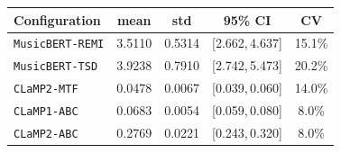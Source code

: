 \begin{tabular}{@{}lcccc@{}}
\toprule
Configuration & mean & std & 95\% CI & CV \\
\midrule
\texttt{MusicBERT-REMI} & 3.5110 & 0.5314 & [2.662,\,4.637] & 15.1\% \\
\texttt{MusicBERT-TSD} & 3.9238 & 0.7910 & [2.742,\,5.473] & 20.2\% \\
\texttt{CLaMP2-MTF} & 0.0478 & 0.0067 & [0.039,\,0.060] & 14.0\% \\
\texttt{CLaMP1-ABC} & 0.0683 & 0.0054 & [0.059,\,0.080] & 8.0\% \\
\texttt{CLaMP2-ABC} & 0.2769 & 0.0221 & [0.243,\,0.320] & 8.0\% \\
\bottomrule
\end{tabular}
